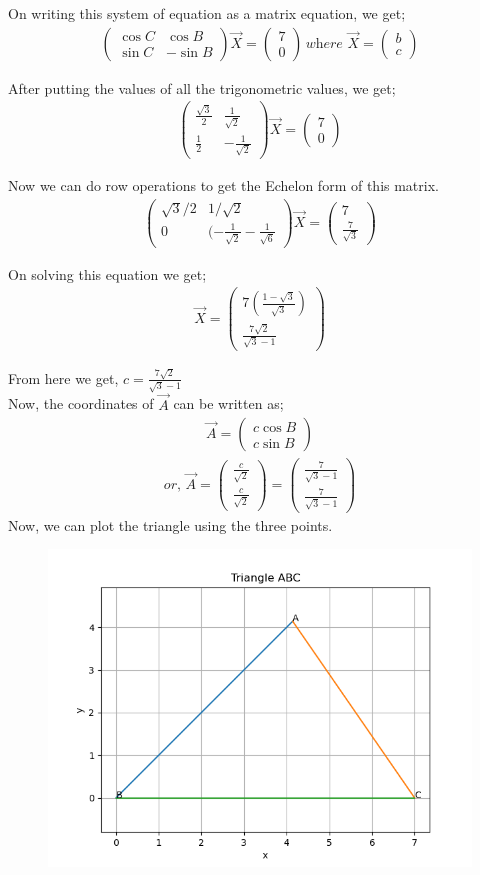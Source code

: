 \documentclass{beamer}
\providecommand{\brak}[1]{\ensuremath{\left(#1\right)}}
\theoremstyle{remark}
\newcommand{\myvec}[1]{\ensuremath{\begin{pmatrix}#1\end{pmatrix}}}
\numberwithin{equation}{section}
\begin{document}
\begin{frame}
On writing this system of equation as a matrix equation, we get;
\begin{align}
\myvec{\cos C & \cos B \\
       \sin C & -\sin B}
\Vec{X} = 
\myvec{7 \\ 0} \, \textit{where } \Vec{X}=\myvec{b \\ c}
\end{align}

After putting the values of all the trigonometric values, we get;
\begin{align}
\myvec{\frac{\sqrt{3}}{2} & \frac{1}{\sqrt{2}} \\
       \frac{1}{2} & -\frac{1}{\sqrt{2}}}
\Vec{X} = 
\myvec{7 \\ 0}
\end{align}

Now we can do row operations to get the Echelon form of this matrix.
\begin{align}
\myvec{\sqrt{3}/2 & 1/\sqrt{2} \\
    0 & (-\frac{1}{\sqrt{2}} - \frac{1}{\sqrt{6}}}
\Vec{X} = 
\myvec{7 \\ \frac{7}{\sqrt{3}}}
\end{align}

On solving this equation we get;
\begin{align}
\Vec{X} = \myvec{7\brak{\frac{1-\sqrt{3}}{\sqrt{3}}} \\ \frac{7\sqrt{2}}{\sqrt{3}-1}}
\end{align}
\end{frame}

\begin{frame}
From here we get, $c=\frac{7\sqrt{2}}{\sqrt{3}-1}$ \\

Now, the coordinates of $\Vec{A}$ can be written as;
\begin{align}
\Vec{A}=\myvec{c\cos B \\ c\sin B}
\end{align}
\begin{align}
or, \, \Vec{A}=\myvec{\frac{c}{\sqrt{2}} \\ \frac{c}{\sqrt{2}}}=\myvec{\frac{7}{\sqrt{3}-1} \\ \frac{7}{\sqrt{3}-1}}
\end{align}
Now, we can plot the triangle using the three points.
\end{frame}

\begin{frame}
\begin{figure}[H]
\centering
\includegraphics[width=0.8\columnwidth]{figs/img.png}
\caption*{}
\end{figure}
\end{frame}
\end{document}

